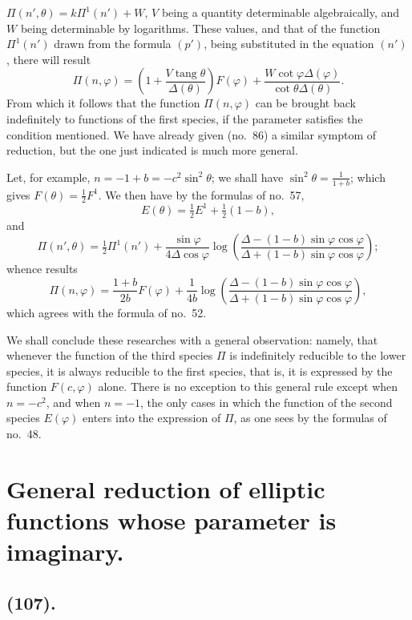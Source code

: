 \documentclass{article}
\begin{document}
$\Pi(n',\theta)=k\Pi^{1}(n')+W$, $V$ being a quantity determinable algebraically, and $W$ being determinable by logarithms. These values, and that of the function $\Pi^{1}(n')$ drawn from the formula $(p')$, being substituted in the equation $(n')$, there will result
\[ \Pi(n,\varphi)=\left(1+\frac{V\operatorname{tang}\theta}{\Delta(\theta)}\right)F(\varphi)+\frac{W\cot\varphi\Delta(\varphi)}{\cot\theta\Delta(\theta)}. \]
From which it follows that the function $\Pi(n,\varphi)$ can be brought back indefinitely to functions of the first species, if the parameter satisfies the condition mentioned. We have already given (no.\ 86) a similar symptom of reduction, but the one just indicated is much more general.

Let, for example, $n=-1+b=-c^{2}\sin^{2}\theta$; we shall have $\sin^{2}\theta=\frac{1}{1+b}$; which gives $F(\theta)=\frac{1}{2}F^{1}$. We then have by the formulas of no.\ 57,
\[ E(\theta)=\tfrac{1}{2}E^{1}+\tfrac{1}{2}(1-b), \]
and
\[ \Pi(n',\theta)=\tfrac{1}{2}\Pi^{1}(n')+\frac{\sin\varphi}{4\Delta\cos\varphi}\log\left(\frac{\Delta-(1-b)\sin\varphi\cos\varphi}{\Delta+(1-b)\sin\varphi\cos\varphi}\right); \]
whence results
\[ \Pi(n,\varphi)=\frac{1+b}{2b}F(\varphi)+\frac{1}{4b}\log\left(\frac{\Delta-(1-b)\sin\varphi\cos\varphi}{\Delta+(1-b)\sin\varphi\cos\varphi}\right), \]
which agrees with the formula of no.\ 52.

We shall conclude these researches with a general observation: namely, that whenever the function of the third species $\Pi$ is indefinitely reducible to the lower species, it is always reducible to the first species, that is, it is expressed by the function $F(c,\varphi)$ alone. There is no exception to this general rule except when $n=-c^{2}$, and when $n=-1$, the only cases in which the function of the second species $E(\varphi)$ enters into the expression of $\Pi$, as one sees by the formulas of no.\ 48.

\section*{General reduction of elliptic functions whose parameter is imaginary.}

\subsection*{(107).}
\end{document}
